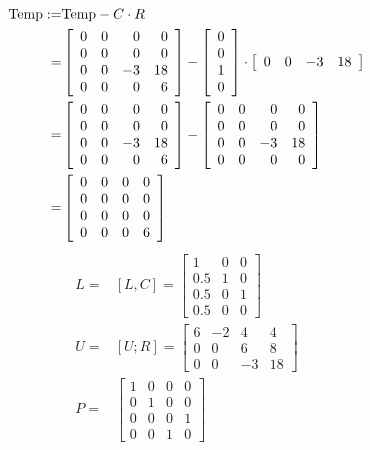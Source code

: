 \begin{align*}
    {\rm Temp} :=& {\rm Temp} - C \cdot R \\
    =& \left[\begin{array}{rrrr} 0 & 0 & 0 & 0\\ 0 & 0 & 0 & 0 \\ 0 & 0 & -3 & 18 \\0 & 0 & 0 & 6 \end{array}\right] 
    - \left[ \begin{array}{r} 0 \\ 0 \\ 1 \\ 0 \end{array} \right] \cdot \left[ \begin{array}{rrrr} 0 & 0 & -3 & 18 \end{array} \right] \\
    =& \left[\begin{array}{rrrr} 0 & 0 & 0 & 0\\ 0 & 0 & 0 & 0 \\ 0 & 0 & -3 & 18 \\0 & 0 & 0 & 6 \end{array}\right] - \left[\begin{array}{rrrr} 0 & 0 & 0 & 0\\ 0 & 0 & 0 & 0 \\ 0 & 0 & -3 & 18 \\0 & 0 & 0 & 0 \end{array}\right] \\
    =& \left[\begin{array}{rrrr} 0 & 0 & 0 & 0\\ 0 & 0 & 0 & 0 \\ 0 & 0 & 0 & 0 \\0 & 0 & 0 & 6 \end{array}\right] \\
\end{align*}
\begin{align*}
    L =& [L, C] = \left[ \begin{array}{rrr} 1 & 0 & 0 \\ 0.5 & 1 & 0 \\ 0.5 & 0 & 1 \\ 0.5 & 0 & 0 \end{array} \right] \\
    U =& [U; R] = \left[ \begin{array}{rrrr} 6 & -2 & 4 & 4 \\ 0 & 0 & 6 & 8 \\ 0 & 0 & -3 & 18 \end{array} \right] \\
    P =& \left[\begin{array}{rrrr} 1 & 0 & 0 & 0\\ 0 & 1 & 0 & 0 \\ 0 & 0 & 0 & 1 \\0 & 0 & 1 & 0 \end{array}\right]
\end{align*}


